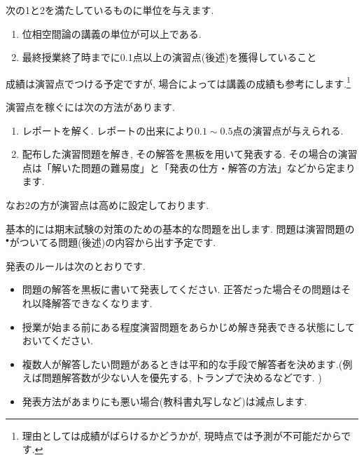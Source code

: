 \documentclass[dvipdfmx,a4paper,11pt]{article}
\theoremstyle{definition}
\begin{document}
次の1と2を満たしているものに単位を与えます.
\begin{enumerate}
  \setlength{\parskip}{0cm} %
  \setlength{\itemsep}{0cm} %
\item 位相空間論の講義の単位が可以上である.
\item 最終授業終了時までに0.1点以上の演習点(後述)を獲得していること
\end{enumerate}
成績は演習点でつける予定ですが, 場合によっては講義の成績も参考にします.\footnote{理由としては成績がばらけるかどうかが, 現時点では予測が不可能だからです. }

\medskip
{}

演習点を稼ぐには次の方法があります.
\begin{enumerate}
  \setlength{\parskip}{0cm} 
  \setlength{\itemsep}{0cm} 
\item レポートを解く. レポートの出来により$0.1\sim0.5$点の演習点が与えられる.
\item 配布した演習問題を解き, その解答を黒板を用いて発表する. その場合の演習点は「解いた問題の難易度」と「発表の仕方・解答の方法」などから定まります.
\end{enumerate}

なお2の方が演習点は高めに設定しております.


\medskip
{}

基本的には期末試験の対策のための基本的な問題を出します.  問題は演習問題の$^{\bullet}$がついてる問題(後述)の内容から出す予定です.

\newpage
{}

発表のルールは次のとおりです.
\begin{itemize}
  \setlength{\parskip}{0cm} 
  \setlength{\itemsep}{0cm} 
\item 問題の解答を黒板に書いて発表してください. 正答だった場合その問題はそれ以降解答できなくなります. %
\item  授業が始まる前にある程度演習問題をあらかじめ解き発表できる状態にしておいてください.
\item 複数人が解答したい問題があるときは平和的な手段で解答者を決めます.(例えば問題解答数が少ない人を優先する, トランプで決めるなどです. )
\item 発表方法があまりにも悪い場合(教科書丸写しなど)は減点します.
\end{itemize}
\end{document}

